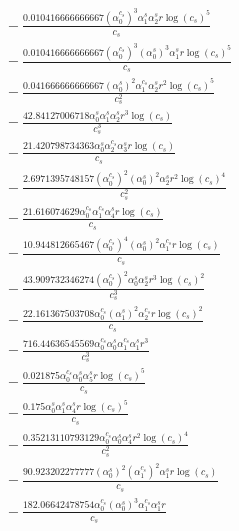 \documentclass[10pt]{article}
\begin{document}
\begin{align*}
&{}  - \frac{0.010416666666667 \left(\alpha_{0}^{c_s}\right)^{3} \alpha_{1}^s \alpha_{2}^s r \log{\left(c_{s} \right)}^{5}}{c_{s}} \\
&{}  - \frac{0.010416666666667 \left(\alpha_{0}^{c_s}\right)^{3} \left(\alpha_{0}^s\right)^{3} \alpha_{1}^s r \log{\left(c_{s} \right)}^{5}}{c_{s}} \\
&{}  - \frac{0.041666666666667 \left(\alpha_{0}^s\right)^{2} \alpha_{1}^{c_s} \alpha_{2}^s r^{2} \log{\left(c_{s} \right)}^{5}}{c_{s}^{2}} \\
&{}  - \frac{42.84127006718 \alpha_{0}^s \alpha_{1}^s \alpha_{2}^s r^{3} \log{\left(c_{s} \right)}}{c_{s}^{3}} \\
&{}  - \frac{21.420798734363 \alpha_{0}^s \alpha_{2}^{c_s} \alpha_{3}^s r \log{\left(c_{s} \right)}}{c_{s}} \\
&{}  - \frac{2.6971395748157 \left(\alpha_{0}^{c_s}\right)^{2} \left(\alpha_{0}^s\right)^{2} \alpha_{2}^s r^{2} \log{\left(c_{s} \right)}^{4}}{c_{s}^{2}} \\
&{}  - \frac{21.616074629 \alpha_{0}^{c_s} \alpha_{1}^{c_s} \alpha_{4}^s r \log{\left(c_{s} \right)}}{c_{s}} \\
&{}  - \frac{10.944812665467 \left(\alpha_{0}^{c_s}\right)^{4} \left(\alpha_{0}^s\right)^{2} \alpha_{1}^{c_s} r \log{\left(c_{s} \right)}}{c_{s}} \\
&{}  - \frac{43.909732346274 \left(\alpha_{0}^{c_s}\right)^{2} \alpha_{0}^s \alpha_{2}^s r^{3} \log{\left(c_{s} \right)}^{2}}{c_{s}^{3}} \\
&{}  - \frac{22.161367503708 \alpha_{0}^{c_s} \left(\alpha_{1}^s\right)^{2} \alpha_{2}^{c_s} r \log{\left(c_{s} \right)}^{2}}{c_{s}} \\
&{}  - \frac{716.44636545569 \alpha_{0}^{c_s} \alpha_{0}^s \alpha_{1}^{c_s} \alpha_{1}^s r^{3}}{c_{s}^{3}} \\
&{}  - \frac{0.021875 \alpha_{0}^{c_s} \alpha_{0}^s \alpha_{5}^s r \log{\left(c_{s} \right)}^{5}}{c_{s}} \\
&{}  - \frac{0.175 \alpha_{0}^s \alpha_{1}^s \alpha_{4}^s r \log{\left(c_{s} \right)}^{5}}{c_{s}} \\
&{}  - \frac{0.35213110793129 \alpha_{0}^{c_s} \alpha_{0}^s \alpha_{4}^s r^{2} \log{\left(c_{s} \right)}^{4}}{c_{s}^{2}} \\
&{}  - \frac{90.923202277777 \left(\alpha_{0}^s\right)^{2} \left(\alpha_{1}^{c_s}\right)^{2} \alpha_{1}^s r \log{\left(c_{s} \right)}}{c_{s}} \\
&{}  - \frac{182.06642478754 \alpha_{0}^{c_s} \left(\alpha_{0}^s\right)^{3} \alpha_{1}^{c_s} \alpha_{1}^s r}{c_{s}} \\

\end{align*}
\end{document}
